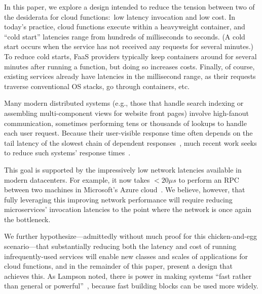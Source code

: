 In this paper, we explore a design intended to reduce the tension between two of
the desiderata for cloud functions:\ low latency invocation and low cost.  In
today's practice, cloud functions execute within a heavyweight container, and
``cold start'' latencies range from hundreds of milliseconds to seconds.  (A
cold start occurs when the service has not received any requests for several
minutes.)  To reduce cold starts, FaaS providers typically keep containers
around for several minutes after running a function, but doing so increases
costs.  Finally, of course, existing services already have latencies in the
millisecond range, as their requests traverse conventional OS stacks, go through
containers, etc.

Many modern distributed systems (e.g., those that handle search indexing or
assembling multi-component views for website front pages) involve
high-fanout communication, sometimes performing tens or thousands of
lookups to handle each user request.  Because their user-visible response time often
depends on the tail latency of the slowest chain of dependent
responses~\cite{Dean:cacm2013}, much recent work seeks to reduce
such systems' response
times~\cite{Jalaparti:sigcomm2013,Xu:nsdi2013,Li:socc2014,Jeon:asplos2016}.

This goal is supported by the impressively low network latencies available in
modern datacenters.  For example, it
now takes $<20\mu{}s$ to perform an RPC between two machines in Microsoft's Azure
cloud~\cite{www-firestone-azure-latency}.  We believe, however, that fully leveraging
this improving network performance will require reducing microservices' invocation
latencies to the point where the network is once again the bottleneck.

We further hypothesize---admittedly without much proof for this chicken-and-egg
scenario---that substantially reducing both the latency and cost of running
infrequently-used services will enable new classes and scales of applications
for cloud functions, and in the remainder of this paper, present a design that
achieves this.  As Lampson noted, there is power in making systems 
``fast rather than general or powerful''~\cite{Lampson1983}, because fast
building blocks can be used more widely.


